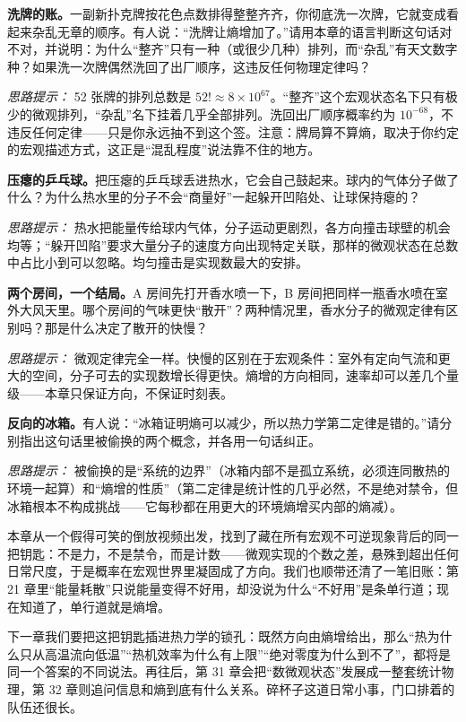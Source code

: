 \begin{puzzles}
\item \textbf{洗牌的账。}一副新扑克牌按花色点数排得整整齐齐，你彻底洗一次牌，它就变成看起来杂乱无章的顺序。有人说：“洗牌让熵增加了。”请用本章的语言判断这句话对不对，并说明：为什么“整齐”只有一种（或很少几种）排列，而“杂乱”有天文数字种？如果洗一次牌偶然洗回了出厂顺序，这违反任何物理定律吗？

  \textit{思路提示：} 52 张牌的排列总数是 \(52!\approx 8\times10^{67}\)。“整齐”这个宏观状态名下只有极少的微观排列，“杂乱”名下挂着几乎全部排列。洗回出厂顺序概率约为 \(10^{-68}\)，不违反任何定律——只是你永远抽不到这个签。注意：牌局算不算熵，取决于你约定的宏观描述方式，这正是“混乱程度”说法靠不住的地方。

\item \textbf{压瘪的乒乓球。}把压瘪的乒乓球丢进热水，它会自己鼓起来。球内的气体分子做了什么？为什么热水里的分子不会“商量好”一起躲开凹陷处、让球保持瘪的？

  \textit{思路提示：} 热水把能量传给球内气体，分子运动更剧烈，各方向撞击球壁的机会均等；“躲开凹陷”要求大量分子的速度方向出现特定关联，那样的微观状态在总数中占比小到可以忽略。均匀撞击是实现数最大的安排。

\item \textbf{两个房间，一个结局。}A 房间先打开香水喷一下，B 房间把同样一瓶香水喷在室外大风天里。哪个房间的气味更快“散开”？两种情况里，香水分子的微观定律有区别吗？那是什么决定了散开的快慢？

  \textit{思路提示：} 微观定律完全一样。快慢的区别在于宏观条件：室外有定向气流和更大的空间，分子可去的实现数增长得更快。熵增的方向相同，速率却可以差几个量级——本章只保证方向，不保证时刻表。

\item \textbf{反向的冰箱。}有人说：“冰箱证明熵可以减少，所以热力学第二定律是错的。”请分别指出这句话里被偷换的两个概念，并各用一句话纠正。

  \textit{思路提示：} 被偷换的是“系统的边界”（冰箱内部不是孤立系统，必须连同散热的环境一起算）和“熵增的性质”（第二定律是统计性的几乎必然，不是绝对禁令，但冰箱根本不构成挑战——它每秒都在用更大的环境熵增买内部的熵减）。
\end{puzzles}

本章从一个假得可笑的倒放视频出发，找到了藏在所有宏观不可逆现象背后的同一把钥匙：不是力，不是禁令，而是计数——微观实现的个数之差，悬殊到超出任何日常尺度，于是概率在宏观世界里凝固成了方向。我们也顺带还清了一笔旧账：第 21 章里“能量耗散”只说能量变得不好用，却没说为什么“不好用”是条单行道；现在知道了，单行道就是熵增。

下一章我们要把这把钥匙插进热力学的锁孔：既然方向由熵增给出，那么“热为什么只从高温流向低温”“热机效率为什么有上限”“绝对零度为什么到不了”，都将是同一个答案的不同说法。再往后，第 31 章会把“数微观状态”发展成一整套统计物理，第 32 章则追问信息和熵到底有什么关系。碎杯子这道日常小事，门口排着的队伍还很长。
